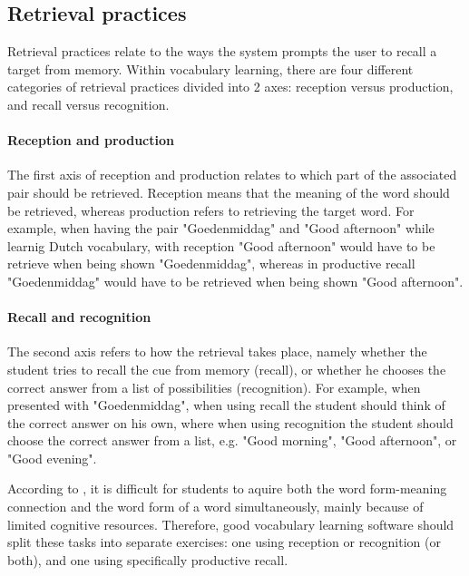         \subsection{Retrieval practices}

Retrieval practices relate to the ways the system prompts the user to recall a target from memory. Within vocabulary learning, there are four different categories of retrieval practices divided into 2 axes: reception versus production, and recall versus recognition. 

\paragraph{Reception and production} The first axis of reception and production relates to which part of the associated pair should be retrieved. Reception means that the meaning of the word should be retrieved, whereas production refers to retrieving the target word. For example, when having the pair "Goedenmiddag" and "Good afternoon" while learnig Dutch vocabulary, with reception "Good afternoon" would have to be retrieve when being shown "Goedenmiddag", whereas in productive recall "Goedenmiddag" would have to be retrieved when being shown "Good afternoon".

\paragraph{Recall and recognition} The second axis refers to how the retrieval takes place, namely whether the student tries to recall the cue from memory (recall), or whether he chooses the correct answer from a list of possibilities (recognition). For example, when presented with "Goedenmiddag", when using recall the student should think of the correct answer on his own, where when using recognition the student should choose the correct answer from a list, e.g. "Good morning", "Good afternoon", or "Good evening".

According to , it is difficult for students to aquire both the word form-meaning connection and the word form of a word simultaneously, mainly because of limited cognitive resources. Therefore, good vocabulary learning software should split these tasks into separate exercises: one using reception or recognition (or both), and one using specifically productive recall.

